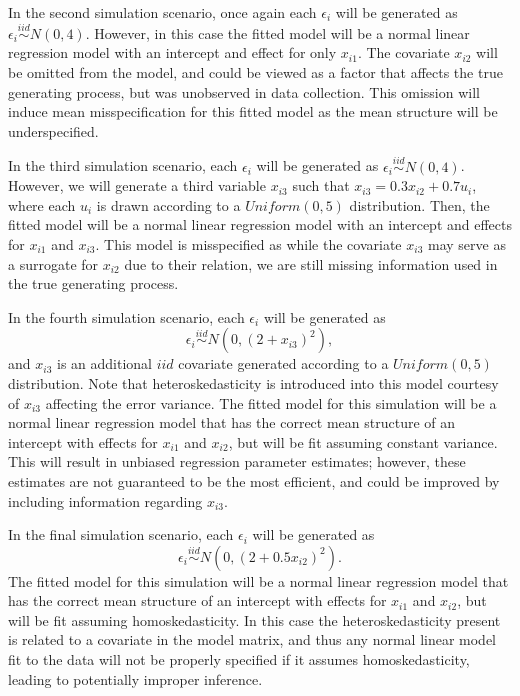 \documentclass[review]{elsarticle}
\begin{document}
In the second simulation scenario, once again each $\epsilon_i$ will be generated as $\epsilon_i \stackrel{iid}{\sim} N(0,4)$.
However, in this case the fitted model will be a normal linear regression model with an intercept and effect for only
$x_{i1}$. The covariate $x_{i2}$ will be omitted from the model, and could be viewed as a factor that affects the true generating process, but
was unobserved in data collection. This omission will induce mean misspecification for this fitted model as the mean structure will be underspecified.

In the third simulation scenario, each $\epsilon_i$ will be generated as $\epsilon_i \stackrel{iid}{\sim} N(0,4)$. 
However, we will generate a third variable $x_{i3}$ such that $x_{i3} = 0.3 x_{i2} + 0.7 u_i$, where each $u_i$ is drawn according to a $Uniform(0,5)$ distribution.
Then, the fitted model will be a normal linear regression model with an intercept and effects for $x_{i1}$ and $x_{i3}$. This model is misspecified as while the covariate $x_{i3}$ 
may serve as a surrogate for $x_{i2}$ due to their relation, we are still missing information used in the true generating process.

In the fourth simulation scenario, each $\epsilon_i$ will be generated as
\[ \epsilon_i \stackrel{iid}{\sim} N \left( 0,(2 + x_{i3})^2 \right) ,\]
and $x_{i3}$ is an additional $iid$ covariate
generated according to a $Uniform(0,5)$ distribution. Note that heteroskedasticity is introduced into this model courtesy of $x_{i3}$ affecting the error variance. The fitted model for
this simulation will be a normal linear regression model that has the correct mean structure of an intercept with effects for $x_{i1}$ and $x_{i2}$, but will be fit assuming constant variance.
This will result in unbiased regression parameter estimates; however, these estimates are not guaranteed to be the most efficient, and could be improved by including information regarding $x_{i3}$.

In the final simulation scenario, each $\epsilon_i$ will be generated as
\[\epsilon_i \stackrel{iid}{\sim} N \left( 0,(2 + 0.5 x_{i2})^2 \right).\] The fitted model for this simulation will be a normal linear regression model that has the correct mean structure of an intercept with effects for $x_{i1}$ and $x_{i2}$,
but will be fit assuming homoskedasticity. In this case the heteroskedasticity present is related to a covariate in the model matrix, and thus any normal linear model fit to the data will not be properly
specified if it assumes homoskedasticity, leading to potentially improper inference.
\end{document}

